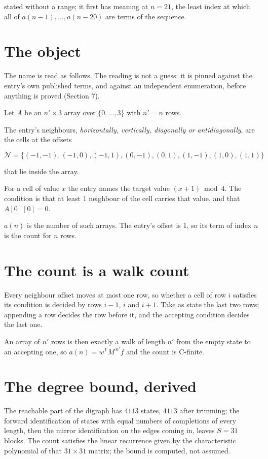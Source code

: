 \documentclass[11pt]{article}
\theoremstyle{definition}
\begin{document}
stated without a range; it first has meaning at $n = 21$, the least index at which all of $a(n-1),\dots,a(n-20)$ are terms of the sequence.

\section{The object}

The name is read as follows. The reading is not a guess: it is pinned against the entry's own published terms, and against an independent enumeration, before anything is proved (Section 7).

Let $A$ be an $n' \times 3$ array over $\{0,\dots,3\}$ with $n' = n$ rows.

The entry's neighbours, {\itshape horizontally, vertically, diagonally or antidiagonally}, are the cells at the offsets

\[\mathcal{N} = \{(-1,-1), (-1,0), (-1,1), (0,-1), (0,1), (1,-1), (1,0), (1,1)\}\]

that lie inside the array.

For a cell of value $x$ the entry names the target value $(x + 1) \bmod 4$. The condition is that at least 1 neighbour of the cell carries that value, and that $A[0][0] = 0$.

$a(n)$ is the number of such arrays. The entry's offset is 1, so its term of index $n$ is the count for $n$ rows.

\section{The count is a walk count}

Every neighbour offset moves at most one row, so whether a cell of row $i$ satisfies its condition is decided by rows $i-1$, $i$ and $i+1$. Take as state the last two rows; appending a row decides the row before it, and the accepting condition decides the last one.

An array of $n'$ rows is then exactly a walk of length $n'$ from the empty state to an accepting one, so $a(n) = w^{\mathsf T}M^{\,n'}f$ and the count is C-finite.

\section{The degree bound, derived}

The reachable part of the digraph has $4113$ states, $4113$ after trimming; the forward identification of states with equal numbers of completions of every length, then the mirror identification on the edges coming in, leaves $S = 31$ blocks. The count satisfies the linear recurrence given by the characteristic polynomial of that $31\times31$ matrix; the bound is computed, not assumed.
\end{document}
